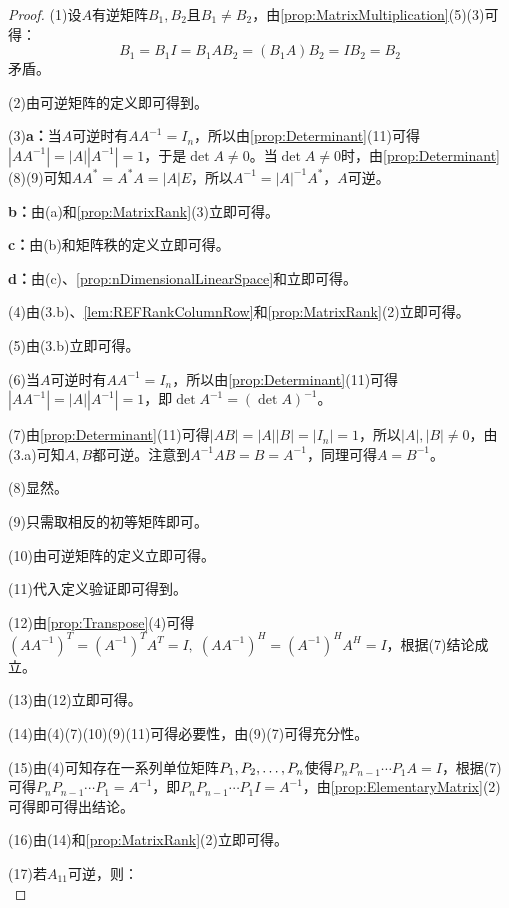 \begin{proof}
	(1)设$A$有逆矩阵$B_1,B_2$且$B_1\ne B_2$，由\cref{prop:MatrixMultiplication}(5)(3)可得：
	\begin{equation*}
		B_1=B_1I=B_1AB_2=(B_1A)B_2=IB_2=B_2
	\end{equation*}
	矛盾。\par
	(2)由可逆矩阵的定义即可得到。\par
	(3)\textbf{a：}当$A$可逆时有$AA^{-1}=I_n$，所以由\cref{prop:Determinant}(11)可得$|AA^{-1}|=|A||A^{-1}|=1$，于是$\det A\ne0$。当$\det A\ne0$时，由\cref{prop:Determinant}(8)(9)可知$AA^*=A^*A=|A|E$，所以$A^{-1}=|A|^{-1}A^*$，$A$可逆。\par
	\textbf{b：}由(a)和\cref{prop:MatrixRank}(3)立即可得。\par
	\textbf{c：}由(b)和矩阵秩的定义立即可得。\par
	\textbf{d：}由(c)、\cref{prop:nDimensionalLinearSpace}和立即可得。\par
	(4)由(3.b)、\cref{lem:REFRankColumnRow}和\cref{prop:MatrixRank}(2)立即可得。\par
	(5)由(3.b)立即可得。\par
	(6)当$A$可逆时有$AA^{-1}=I_n$，所以由\cref{prop:Determinant}(11)可得$|AA^{-1}|=|A||A^{-1}|=1$，即$\det A^{-1}=(\det A)^{-1}$。\par
	(7)由\cref{prop:Determinant}(11)可得$|AB|=|A||B|=|I_n|=1$，所以$|A|,|B|\ne0$，由(3.a)可知$A,B$都可逆。注意到$A^{-1}AB=B=A^{-1}$，同理可得$A=B^{-1}$。\par
	(8)显然。\par
	(9)只需取相反的初等矩阵即可。\par
	(10)由可逆矩阵的定义立即可得。\par
	(11)代入定义验证即可得到。\par
	(12)由\cref{prop:Transpose}(4)可得$(AA^{-1})^T=(A^{-1})^TA^T=I,\;(AA^{-1})^H=(A^{-1})^HA^H=I$，根据(7)结论成立。\par
	(13)由(12)立即可得。\par
	(14)由(4)(7)(10)(9)(11)可得必要性，由(9)(7)可得充分性。\par
	(15)由(4)可知存在一系列单位矩阵$P_1, P_2, \dots, P_{n}$使得$P_nP_{n-1}\cdots P_1A=I$，根据(7)可得$P_nP_{n-1}\cdots P_1=A^{-1}$，即$P_nP_{n-1}\cdots P_1I=A^{-1}$，由\cref{prop:ElementaryMatrix}(2)可得即可得出结论。\par
	(16)由(14)和\cref{prop:MatrixRank}(2)立即可得。\par
	(17)若$A_{11}$可逆，则：
	\begin{equation*}

\end{equation*}
\end{proof}
